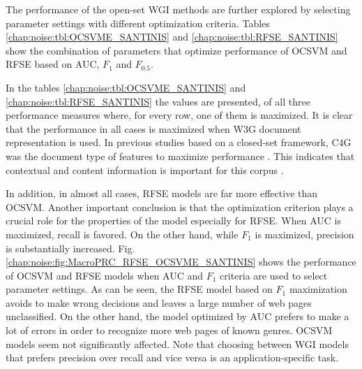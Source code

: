 The performance of the open-set WGI methods are further explored by selecting parameter settings with different optimization criteria. Tables \ref{chap:noise:tbl:OCSVME_SANTINIS} and \ref{chap:noise:tbl:RFSE_SANTINIS} show the combination of parameters that optimize performance of OCSVM and RFSE based on AUC, $F_{1}$ and $F_{0.5}$. 

In the tables \ref{chap:noise:tbl:OCSVME_SANTINIS} and \ref{chap:noise:tbl:RFSE_SANTINIS} the values are presented, of all three performance measures where, for every row, one of them is maximized. It is clear that the performance in all cases is maximized when W3G document representation is used. In previous studies based on a closed-set framework, C4G was the document type of features to maximize performance \parencite{Sharroff2010}. This indicates that contextual and content information is important for this corpus \parencite{Asheghi2015}.

In addition, in almost all cases, RFSE models are far more effective than OCSVM. Another important conclusion is that the optimization criterion plays a crucial role for the properties of the model especially for RFSE. When AUC is maximized, recall is favored. On the other hand, while $F_{1}$ is maximized, precision is substantially increased. Fig. \ref{chap:noise:fig:MacroPRC_RFSE_OCSVME_SANTINIS} shows the performance of OCSVM and RFSE models when AUC and $F_{1}$ criteria are used to select parameter settings. As can be seen, the RFSE model based on $F_{1}$ maximization avoids to make wrong decisions and leaves a large number of web pages unclassified. On the other hand, the model optimized by AUC prefers to make a lot of errors in order to recognize more web pages of known genres. OCSVM models seem not significantly affected. Note that choosing between WGI models that prefers precision over recall and vice versa is an application-specific task.

